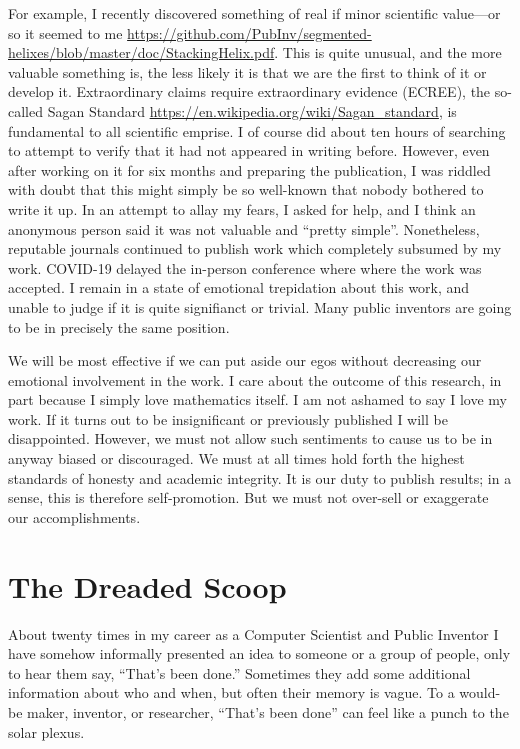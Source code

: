 \documentclass[
	fontsize=10pt, %
	twoside=false, %
	secnumdepth=1, %
]{kaobook}
\begin{document}
For example, I recently discovered something of
real if minor scientific value---or so it seemed to me \url{https://github.com/PubInv/segmented-helixes/blob/master/doc/StackingHelix.pdf}.
This is quite unusual, and the more valuable something is,
the less likely it is that we are the first to think of it
or develop it.
Extraordinary claims require extraordinary evidence (ECREE),
the so-called Sagan Standard \url{https://en.wikipedia.org/wiki/Sagan_standard},
is fundamental to all scientific emprise.
I of course did about ten hours of searching to
attempt to verify that it had not appeared in writing before.
However, even after working on it for six months and preparing
the publication, I was riddled with doubt that this might simply
be so well-known that nobody bothered to write it up.
In an attempt to allay my fears, I asked for help, and
I think an anonymous person said it was not valuable and ``pretty simple''.
Nonetheless, reputable journals continued to publish work
which completely subsumed by my work. COVID-19 delayed the
in-person conference where where the work was accepted.
I remain in a state of emotional trepidation about this work,
and unable to judge if it is quite signifianct or trivial.
Many public inventors are going to be in precisely the
same position.

We will be most effective if we can put aside our egos
without decreasing our emotional involvement in the work.
I care about the outcome of this research, in part because
I simply love mathematics itself.
I am not ashamed to say I love my work. If it turns out
to be insignificant or previously published I will be disappointed.
However, we must not allow such sentiments to cause
us to be in anyway biased or discouraged.
We must at all times hold forth the highest standards
of honesty and academic integrity.
It is our duty to publish results; in a sense,
this is therefore self-promotion.
But we must not over-sell or exaggerate our accomplishments.

\section{The Dreaded Scoop}

About twenty times in my career as a Computer Scientist and Public
Inventor I have somehow informally presented an idea to someone or a
group of people, only to hear them say, “That’s been done.”  Sometimes
they add some additional information about who and when, but often
their memory is vague.  To a would-be maker, inventor, or researcher,
“That’s been done” can feel like a punch to the solar plexus.
\end{document}
